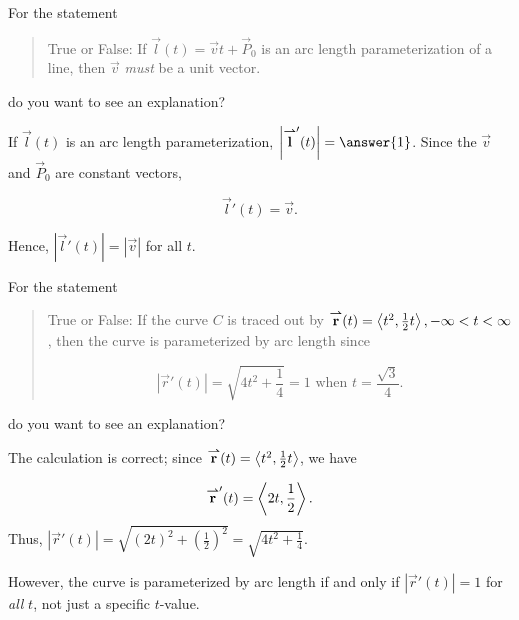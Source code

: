 \documentclass{ximera}
\begin{document}
\begin{exercise}
\begin{hint}
\begin{question}
For the statement

\begin{quote}
True or False: If $\vec{l}(t) = \vec{v}t+\vec{P}_0$ is an arc length parameterization of a line, then $\vec{v}$ \emph{must} be a unit vector.
\end{quote}
do you want to see an explanation?

\begin{multipleChoice}
\end{multipleChoice}

\begin{feedback}[correct]
If $\vec{l}(t)$ is an arc length parameterization, $\left|\vec{l}'(t)\right| = \answer{1}$.  Since the $\vec{v}$ and $\vec{P}_0$ are constant vectors, 

\[
\vec{l}'(t) = \vec{v}.
\]

Hence, $\left|\vec{l}'(t)\right| = \left|\vec{v}\right|$ for all $t$.

\end{feedback}
\end{question}


\begin{question}
For the statement

\begin{quote}
True or False: If the curve $C$ is traced out by ${\overset{\boldsymbol{\rightharpoonup}}{\mathbf{r}}}(t) = \left\langle t^2,\frac{1}{2}t\right\rangle, -\infty < t < \infty$, then the curve is parameterized by arc length since 

\[ |\vec{r}'(t)| = \sqrt{4t^2+\frac{1}{4}} = 1 \textrm{  when } t = \frac{\sqrt{3}}{4}. \]
\end{quote}
do you want to see an explanation?

\begin{multipleChoice}
\end{multipleChoice}

\begin{feedback}[correct]
The calculation is correct; since ${\overset{\boldsymbol{\rightharpoonup}}{\mathbf{r}}}(t) = \left\langle t^2,\frac{1}{2}t\right\rangle$, we have

\[
{\overset{\boldsymbol{\rightharpoonup}}{\mathbf{r}}}'(t) = \left\langle 2t,\frac{1}{2}\right\rangle.
\]
Thus, $|\vec{r}'(t)| = \sqrt{(2t)^2+\left(\frac{1}{2}\right)^2} = \sqrt{4t^2+\frac{1}{4}}$.

However, the curve is parameterized by arc length if and only if $|\vec{r}'(t)| =1$ for \emph{all} $t$, not just a specific $t$-value.
\end{feedback}
\end{question}



\end{hint}
\end{exercise}
\end{document}
